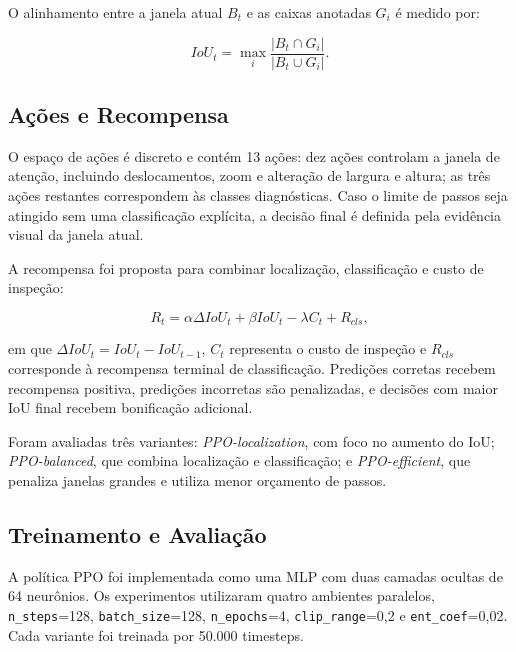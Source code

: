 O alinhamento entre a janela atual $B_t$ e as caixas anotadas $G_i$ é medido por:

\begin{equation}
IoU_t = \max_i \frac{|B_t \cap G_i|}{|B_t \cup G_i|}.
\end{equation}

\subsection{Ações e Recompensa}

O espaço de ações é discreto e contém 13 ações: dez ações controlam a janela de
atenção, incluindo deslocamentos, zoom e alteração de largura e altura; as três ações
restantes correspondem às classes diagnósticas. Caso o limite de passos seja atingido
sem uma classificação explícita, a decisão final é definida pela evidência visual da
janela atual.

A recompensa foi proposta para combinar localização, classificação e custo de inspeção:

\begin{equation}
R_t = \alpha \Delta IoU_t + \beta IoU_t - \lambda C_t + R_{cls},
\end{equation}

\noindent em que $\Delta IoU_t = IoU_t - IoU_{t-1}$, $C_t$ representa o custo de
inspeção e $R_{cls}$ corresponde à recompensa terminal de classificação. Predições
corretas recebem recompensa positiva, predições incorretas são penalizadas, e decisões
com maior IoU final recebem bonificação adicional.

Foram avaliadas três variantes: \textit{PPO-localization}, com foco no aumento do IoU;
\textit{PPO-balanced}, que combina localização e classificação; e
\textit{PPO-efficient}, que penaliza janelas grandes e utiliza menor orçamento de
passos.

\subsection{Treinamento e Avaliação}

A política PPO foi implementada como uma MLP com duas camadas ocultas de 64 neurônios.
Os experimentos utilizaram quatro ambientes paralelos, \texttt{n\_steps}=128,
\texttt{batch\_size}=128, \texttt{n\_epochs}=4, \texttt{clip\_range}=0{,}2 e
\texttt{ent\_coef}=0{,}02. Cada variante foi treinada por 50.000 timesteps.

